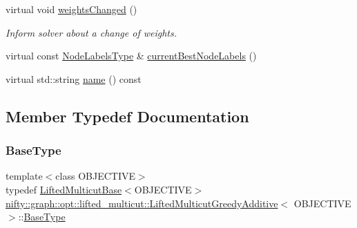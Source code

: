\begin{DoxyCompactItemize}
\item 
virtual void \hyperlink{classnifty_1_1graph_1_1opt_1_1lifted__multicut_1_1LiftedMulticutGreedyAdditive_a13ed6cbca21df0bb7fc22d298533e4a7}{weights\+Changed} ()
\begin{DoxyCompactList}\small\item\em Inform solver about a change of weights. \end{DoxyCompactList}\item 
virtual const \hyperlink{classnifty_1_1graph_1_1opt_1_1lifted__multicut_1_1LiftedMulticutGreedyAdditive_a67a2931a00a97fa2838ed9ae1158c7bf}{Node\+Labels\+Type} \& \hyperlink{classnifty_1_1graph_1_1opt_1_1lifted__multicut_1_1LiftedMulticutGreedyAdditive_a106015648a9e405c590a32303364e850}{current\+Best\+Node\+Labels} ()
\item 
virtual std\+::string \hyperlink{classnifty_1_1graph_1_1opt_1_1lifted__multicut_1_1LiftedMulticutGreedyAdditive_aa7320a44731a6784ec5151b4c680d4b4}{name} () const
\end{DoxyCompactItemize}


\subsection{Member Typedef Documentation}
\mbox{\label{classnifty_1_1graph_1_1opt_1_1lifted__multicut_1_1LiftedMulticutGreedyAdditive_a7cf1a7181ae6580e2c3d73eda804ec75}} 
\subsubsection{\texorpdfstring{Base\+Type}{BaseType}}
{\footnotesize\ttfamily template$<$class O\+B\+J\+E\+C\+T\+I\+VE$>$ \\
typedef \hyperlink{classnifty_1_1graph_1_1opt_1_1lifted__multicut_1_1LiftedMulticutBase}{Lifted\+Multicut\+Base}$<$O\+B\+J\+E\+C\+T\+I\+VE$>$ \hyperlink{classnifty_1_1graph_1_1opt_1_1lifted__multicut_1_1LiftedMulticutGreedyAdditive}{nifty\+::graph\+::opt\+::lifted\+\_\+multicut\+::\+Lifted\+Multicut\+Greedy\+Additive}$<$ O\+B\+J\+E\+C\+T\+I\+VE $>$\+::\hyperlink{classnifty_1_1graph_1_1opt_1_1lifted__multicut_1_1LiftedMulticutGreedyAdditive_a7cf1a7181ae6580e2c3d73eda804ec75}{Base\+Type}}

